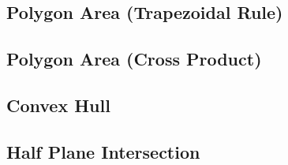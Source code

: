 \documentclass[11pt, letterpaper]{article}
\begin{document}
\subsection{Polygon Area (Trapezoidal Rule)}


\subsection{Polygon Area (Cross Product)}


\subsection{Convex Hull}


\subsection{Half Plane Intersection}

\end{document}
